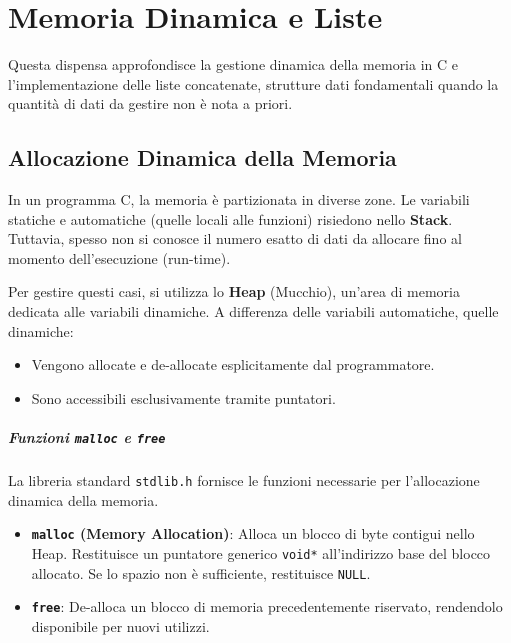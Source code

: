 \documentclass[oneside]{scrbook}
\begin{document}
\chapter{Memoria Dinamica e Liste}

Questa dispensa approfondisce la gestione dinamica della memoria in C e l'implementazione delle liste concatenate, strutture dati fondamentali quando la quantità di dati da gestire non è nota a priori.

\section{Allocazione Dinamica della Memoria}

In un programma C, la memoria è partizionata in diverse zone. Le variabili statiche e automatiche (quelle locali alle funzioni) risiedono nello \textbf{Stack}. Tuttavia, spesso non si conosce il numero esatto di dati da allocare fino al momento dell'esecuzione (run-time).


Per gestire questi casi, si utilizza lo \textbf{Heap} (Mucchio), un'area di memoria dedicata alle variabili dinamiche. A differenza delle variabili automatiche, quelle dinamiche:
\begin{itemize}
    \item Vengono allocate e de-allocate esplicitamente dal programmatore.
    \item Sono accessibili esclusivamente tramite puntatori.
\end{itemize}

\paragraph{Funzioni \texttt{malloc} e \texttt{free}}

La libreria standard \texttt{stdlib.h} fornisce le funzioni necessarie per l'allocazione dinamica della memoria.

\begin{itemize}
    \item \textbf{\texttt{malloc} (Memory Allocation)}: Alloca un blocco di byte contigui nello Heap. Restituisce un puntatore generico \texttt{void*} all'indirizzo base del blocco allocato. Se lo spazio non è sufficiente, restituisce \texttt{NULL}.
    \item \textbf{\texttt{free}}: De-alloca un blocco di memoria precedentemente riservato, rendendolo disponibile per nuovi utilizzi.
\end{itemize}
\end{document}
